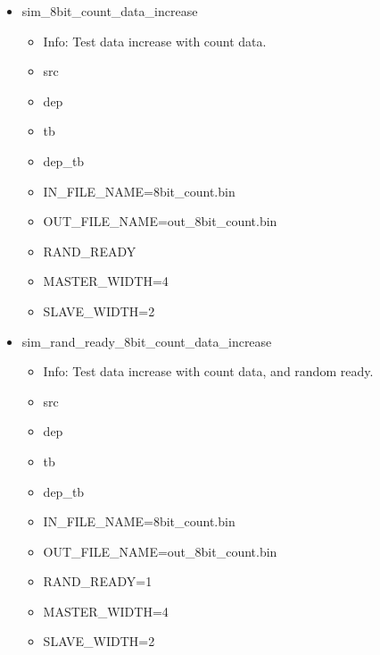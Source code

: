 \begin{itemize}
\begin{itemize}
	\end{itemize}
\item sim\_8bit\_count\_data\_increase
	\begin{itemize}
	\item[$\space$] Info: Test data increase with count data.
	\item src
	\item dep
	\item tb
	\item dep\_tb
	\item IN\_FILE\_NAME=8bit\_count.bin
	\item OUT\_FILE\_NAME=out\_8bit\_count.bin
	\item RAND\_READY
	\item MASTER\_WIDTH=4
	\item SLAVE\_WIDTH=2
	\end{itemize}
\item sim\_rand\_ready\_8bit\_count\_data\_increase
	\begin{itemize}
	\item[$\space$] Info: Test data increase with count data, and random ready.
	\item src
	\item dep
	\item tb
	\item dep\_tb
	\item IN\_FILE\_NAME=8bit\_count.bin
	\item OUT\_FILE\_NAME=out\_8bit\_count.bin
	\item RAND\_READY=1
	\item MASTER\_WIDTH=4
	\item SLAVE\_WIDTH=2
	\end{itemize}
\end{itemize}

